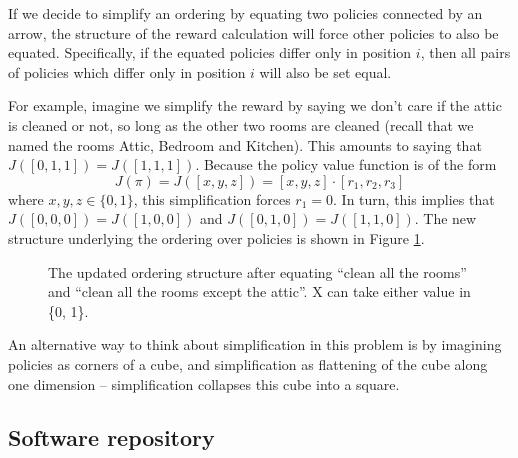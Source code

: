 If we decide to simplify an ordering by equating
two policies connected by an arrow, the structure of the reward calculation will force other policies to also be equated.
Specifically,
if the equated policies differ only in position $i$, then all pairs of policies
which differ only in position $i$ will
also be set equal.

For example, imagine we simplify the reward by saying we don't care if the attic is cleaned or not, so long as the other two rooms are cleaned (recall that we named the rooms Attic, Bedroom and Kitchen). This amounts to saying that $J([0, 1, 1]) = J([1, 1, 1])$. 
Because the policy value function is of the form
\begin{equation*}
    J(\pi) = J([x, y, z]) = [x, y, z] \cdot [r_1, r_2, r_3]
\end{equation*}
where $x, y, z \in \{0, 1\}$, this simplification forces $r_1 = 0$. In turn, this implies that
$J([0, 0, 0]) = J([1, 0, 0])$ and $J([0, 1, 0]) = J([1, 1, 0])$. The new structure underlying the ordering over policies is shown in Figure \ref{fig:simplified_cleaning_policy_ordering}.

\begin{figure}[H]
\centering
{}
\caption{The updated ordering structure after equating \enquote{clean all
the rooms} and \enquote{clean all the rooms except the attic}.
X can take either value in \{0, 1\}.
}
\label{fig:simplified_cleaning_policy_ordering}
\end{figure}

An alternative way to think about simplification in this problem is by imagining policies as corners of a cube, and simplification as flattening of the cube along one dimension -- 
simplification collapses this cube into a square.


        
    


\subsection{Software repository}
\label{sec:software}

